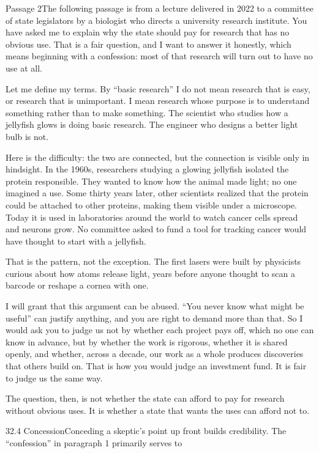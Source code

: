 \documentclass[11pt]{article}
\begin{document}
\begin{passage}{Passage 2}{The following passage is from a lecture delivered in 2022 to a committee of state legislators by a biologist who directs a university research institute.}
 You have asked me to explain why the state should pay for research that has no obvious use. That is a fair question, and I want to answer it honestly, which means beginning with a confession: most of that research will turn out to have no use at all.

 Let me define my terms. By ``basic research'' I do not mean research that is easy, or research that is unimportant. I mean research whose purpose is to understand something rather than to make something. The scientist who studies how a jellyfish glows is doing basic research. The engineer who designs a better light bulb is not.

 Here is the difficulty: the two are connected, but the connection is visible only in hindsight. In the 1960s, researchers studying a glowing jellyfish isolated the protein responsible. They wanted to know how the animal made light; no one imagined a use. Some thirty years later, other scientists realized that the protein could be attached to other proteins, making them visible under a microscope. Today it is used in laboratories around the world to watch cancer cells spread and neurons grow. No committee asked to fund a tool for tracking cancer would have thought to start with a jellyfish.

 That is the pattern, not the exception. The first lasers were built by physicists curious about how atoms release light, years before anyone thought to scan a barcode or reshape a cornea with one.

 I will grant that this argument can be abused. ``You never know what might be useful'' can justify anything, and you are right to demand more than that. So I would ask you to judge us not by whether each project pays off, which no one can know in advance, but by whether the work is rigorous, whether it is shared openly, and whether, across a decade, our work as a whole produces discoveries that others build on. That is how you would judge an investment fund. It is fair to judge us the same way.

 The question, then, is not whether the state can afford to pay for research without obvious uses. It is whether a state that wants the uses can afford not to.
\end{passage}

\begin{q}{3}{2.4 Concession}{Conceding a skeptic's point up front builds credibility.}
The ``confession'' in paragraph 1 primarily serves to
\end{q}
\end{document}
